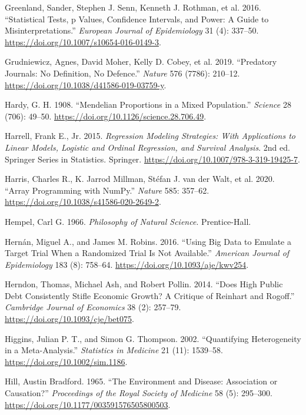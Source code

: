 \documentclass[
]{book}
\newlength{\cslhangindent}
\newenvironment{CSLReferences}[2] %
 {\begin{list}{}{%
  \setlength{\itemindent}{0pt}
  \setlength{\leftmargin}{0pt}
  \setlength{\parsep}{0pt}
  \ifodd #1
   \setlength{\leftmargin}{\cslhangindent}
   \setlength{\itemindent}{-1\cslhangindent}
  \fi
  \setlength{\itemsep}{#2\baselineskip}}}
 {\end{list}}
\begin{document}
\begin{CSLReferences}{1}{1}
Greenland, Sander, Stephen J. Senn, Kenneth J. Rothman, et al. 2016. {``Statistical Tests, p Values, Confidence Intervals, and Power: A Guide to Misinterpretations.''} \emph{European Journal of Epidemiology} 31 (4): 337--50. \url{https://doi.org/10.1007/s10654-016-0149-3}.

{Grudniewicz, Agnes, David Moher, Kelly D. Cobey, et al.} 2019. {``Predatory Journals: No Definition, No Defence.''} \emph{Nature} 576 (7786): 210--12. \url{https://doi.org/10.1038/d41586-019-03759-y}.

Hardy, G. H. 1908. {``Mendelian Proportions in a Mixed Population.''} \emph{Science} 28 (706): 49--50. \url{https://doi.org/10.1126/science.28.706.49}.

Harrell, Frank E., Jr. 2015. \emph{Regression Modeling Strategies: With Applications to Linear Models, Logistic and Ordinal Regression, and Survival Analysis}. 2nd ed. Springer Series in Statistics. Springer. \url{https://doi.org/10.1007/978-3-319-19425-7}.

{Harris, Charles R., K. Jarrod Millman, Stéfan J. van der Walt, et al.} 2020. {``Array Programming with {NumPy}.''} \emph{Nature} 585: 357--62. \url{https://doi.org/10.1038/s41586-020-2649-2}.

Hempel, Carl G. 1966. \emph{Philosophy of Natural Science}. Prentice-Hall.

Hernán, Miguel A., and James M. Robins. 2016. {``Using Big Data to Emulate a Target Trial When a Randomized Trial Is Not Available.''} \emph{American Journal of Epidemiology} 183 (8): 758--64. \url{https://doi.org/10.1093/aje/kwv254}.

Herndon, Thomas, Michael Ash, and Robert Pollin. 2014. {``Does High Public Debt Consistently Stifle Economic Growth? {A} Critique of {Reinhart} and {Rogoff}.''} \emph{Cambridge Journal of Economics} 38 (2): 257--79. \url{https://doi.org/10.1093/cje/bet075}.

Higgins, Julian P. T., and Simon G. Thompson. 2002. {``Quantifying Heterogeneity in a Meta-Analysis.''} \emph{Statistics in Medicine} 21 (11): 1539--58. \url{https://doi.org/10.1002/sim.1186}.

Hill, Austin Bradford. 1965. {``The Environment and Disease: Association or Causation?''} \emph{Proceedings of the Royal Society of Medicine} 58 (5): 295--300. \url{https://doi.org/10.1177/003591576505800503}.


\end{CSLReferences}
\end{document}
